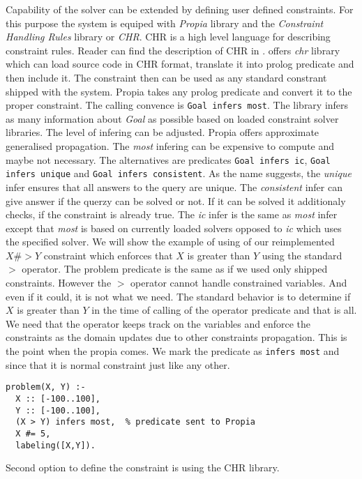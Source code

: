 Capability of the solver can be extended by defining user defined constraints. For this
purpose the system is equiped with {\em Propia} library and the {\em Constraint Handling Rules}
library or {\em CHR}. CHR is a high level language for describing constraint rules. Reader can find
the description of CHR in \cite{fru_chr_book_2009}.
\eclipse offers {\em chr} library which can load source code in CHR format, translate it
into prolog predicate and then include it. The constraint then can be used as any standard
constrant shipped with the system.
Propia takes any prolog predicate and convert it to the proper constraint.
The calling convence is \texttt{Goal infers most}. The library infers as many information about {\em Goal} 
as possible based on loaded constraint solver libraries. The level of infering can be adjusted.
Propia offers approximate generalised propagation. The {\em most} infering can be expensive 
to compute and maybe not necessary. The alternatives are predicates \texttt{Goal infers ic}, 
\texttt{Goal infers unique} and \texttt{Goal infers consistent}. As the name suggests, the {\em unique} 
infer ensures that all answers to the query are unique. The {\em consistent} infer can give
answer if the querzy can be solved or not. If it can be solved it additionaly checks, if the
constraint is already true. The {\em ic} infer is the same as {\em most} infer except that
{\em most} is based on currently loaded solvers opposed to {\em ic} which uses the specified solver.
We will show the example of using of our reimplemented $X \#> Y$ constraint which 
enforces that $X$ is greater than $Y$ using the standard $>$ operator. The problem predicate is the same 
as if we used only shipped constraints. However the $>$ operator cannot handle constrained
variables. And even if it could, it is not what we need. The standard behavior is to 
determine if $X$ is greater than $Y$ in the time of calling of the operator predicate and
that is all. We need that the operator keeps track on the variables and enforce the constraints
as the domain updates due to other constraints propagation. This is the point when the propia
comes. We mark the predicate as \texttt{infers most} and since that it is normal
constraint just like any other.

\begin{verbatim}
problem(X, Y) :-
  X :: [-100..100], 
  Y :: [-100..100], 
  (X > Y) infers most,  % predicate sent to Propia   
  X #= 5, 
  labeling([X,Y]).
\end{verbatim}

Second option to define the constraint is using the CHR library. 
